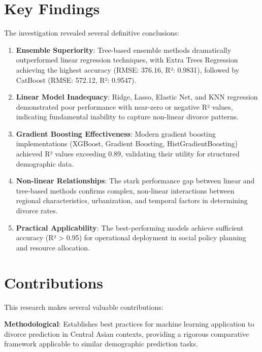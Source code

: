 \section{Key Findings}

The investigation revealed several definitive conclusions:

\begin{enumerate}
    \item \textbf{Ensemble Superiority}: Tree-based ensemble methods dramatically outperformed linear regression techniques, with Extra Trees Regression achieving the highest accuracy (RMSE: 376.16, R²: 0.9831), followed by CatBoost (RMSE: 572.12, R²: 0.9547).
    
    \item \textbf{Linear Model Inadequacy}: Ridge, Lasso, Elastic Net, and KNN regression demonstrated poor performance with near-zero or negative R² values, indicating fundamental inability to capture non-linear divorce patterns.
    
    \item \textbf{Gradient Boosting Effectiveness}: Modern gradient boosting implementations (XGBoost, Gradient Boosting, HistGradientBoosting) achieved R² values exceeding 0.89, validating their utility for structured demographic data.
    
    \item \textbf{Non-linear Relationships}: The stark performance gap between linear and tree-based methods confirms complex, non-linear interactions between regional characteristics, urbanization, and temporal factors in determining divorce rates.
    
    \item \textbf{Practical Applicability}: The best-performing models achieve sufficient accuracy (R² > 0.95) for operational deployment in social policy planning and resource allocation.
\end{enumerate}

\section{Contributions}

This research makes several valuable contributions:

\textbf{Methodological}: Establishes best practices for machine learning application to divorce prediction in Central Asian contexts, providing a rigorous comparative framework applicable to similar demographic prediction tasks.

